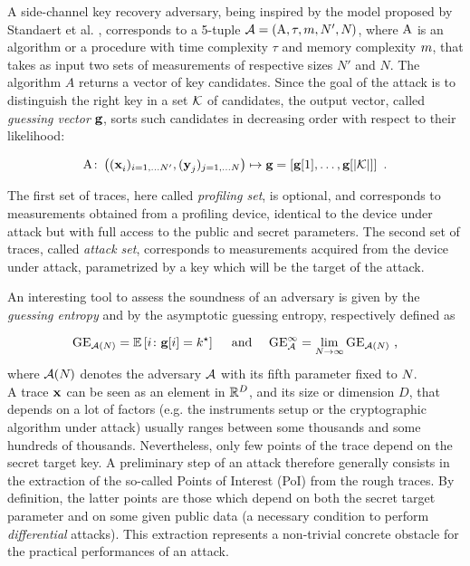 A side-channel key recovery adversary, being inspired by the model proposed by Standaert et al. \cite{unifiedFramework}, corresponds to a 5-tuple  $\adversary = (\attackAlgorithm, \tau, \memComplexity , \numTraces[]', \numTraces[])$, where $\attackAlgorithm$ is an algorithm or a procedure with time complexity $\tau$ and memory complexity $\memComplexity$, that takes as input two sets of measurements of respective sizes $N'$ and $N$. The algorithm $A$ returns a vector of key candidates. Since the goal of the attack is to distinguish the right key in a set  $\keySet$  of candidates, the output vector, called {\em guessing vector} $\guessingVector$, sorts such candidates in decreasing order with respect to their likelihood:

\begin{equation}
\attackAlgorithm \colon \left( (\sss[]{i})_{i=1,\dots \numTraces[]'}, (\sssTest[]{j})_{j=1,\dots \numTraces[]} \right) \mapsto \guessingVector = \left[\guessingVector[1], \dots, \guessingVector[{\lvert \keySet \rvert}]\right] \mbox{ .}
\end{equation}


The first set of traces, here called {\em profiling set}, is optional, and corresponds to measurements obtained from a profiling device, identical to the device under attack but with full access to the public and secret parameters. The second set of traces,  called {\em attack set}, corresponds to measurements acquired from the device under attack, parametrized by a key which will be the target of the attack.

An interesting tool to assess the soundness of an adversary is given by the {\em guessing entropy} \cite{massey1994guessing} and by the {asymptotic guessing entropy}, respectively defined as

\begin{equation}
\guessingEntropy_{\adversary(\numTraces[])}  = \mathbb{E}\left[i \colon \guessingVector[i] = \keyTest \right] \quad \mbox{ and } \quad \guessingEntropy^\infty_\adversary  = \lim_{\numTraces[]\rightarrow \infty} \guessingEntropy_{\adversary(\numTraces[])} \mbox{ ,}
\end{equation}
where $\adversary(\numTraces[])$ denotes the adversary $\adversary$ with its fifth parameter fixed to $\numTraces[]$.\\

A trace $\sss[]{}$ can be seen as an element in $\mathbb{R}^\traceLength$, and its size or dimension $D$, that depends on a lot of factors (e.g. the instruments setup or the cryptographic algorithm under attack) usually ranges between some thousands and some hundreds of thousands. Nevertheless, only few points of the trace depend on the secret target key. A preliminary step of an attack therefore generally consists in the extraction of the so-called {Points of Interest (PoI)} from the  rough traces. By definition, the latter points are those which depend on both the secret target parameter and on some given public data (a necessary condition to perform {\em differential} attacks). This extraction represents a non-trivial concrete obstacle for the practical performances of an attack.

